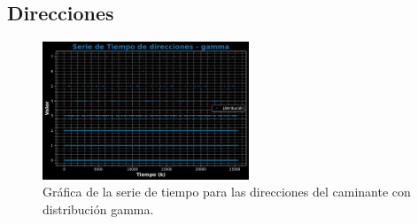 \documentclass[11pt]{article} %
\begin{document}
	\subsection{Direcciones}
	\begin{figure}[h]
		\centering
		\includegraphics[width=0.55\textwidth]{graf_direcciones_gamma.pdf}
		\caption{Gráfica de la serie de tiempo para las direcciones del caminante con distribución gamma.}
		\label{fig:direcGammaGraf}
	\end{figure}
\end{document}
